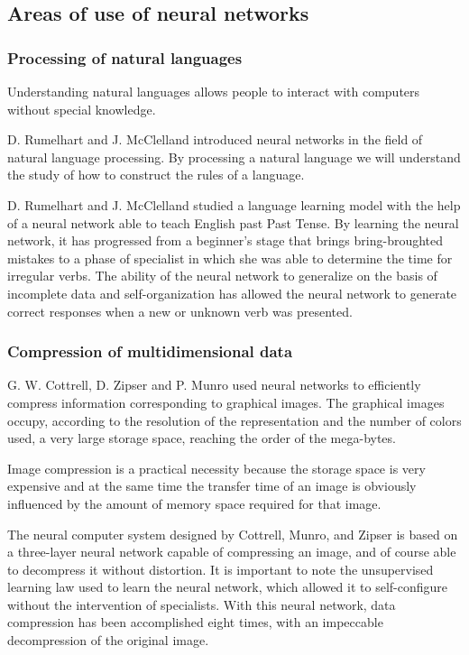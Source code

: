 \subsection{Areas of use of neural networks}

\subsubsection{Processing of natural languages}

Understanding natural languages allows people to interact with computers without special knowledge.

D. Rumelhart and J. McClelland \cite{Rumelhart} introduced neural networks in the field of natural language processing. By processing a natural language we will understand the study of how to construct the rules of a language.

D. Rumelhart and J. McClelland studied a language learning model with the help of a neural network able to teach English past Past Tense. By learning the neural network, it has progressed from a beginner's stage that brings bring-broughted mistakes to a phase of specialist in which she was able to determine the time for irregular verbs. The ability of the neural network to generalize on the basis of incomplete data and self-organization has allowed the neural network to generate correct responses when a new or unknown verb was presented.

\subsubsection{Compression of multidimensional data}

G. W. Cottrell, D. Zipser and P. Munro \cite{Cottrell} used neural networks to efficiently compress information corresponding to graphical images. The graphical images occupy, according to the resolution of the representation and the number of colors used, a very large storage space, reaching the order of the mega-bytes.

Image compression is a practical necessity because the storage space is very expensive and at the same time the transfer time of an image is obviously influenced by the amount of memory space required for that image.

The neural computer system designed by Cottrell, Munro, and Zipser is based on a three-layer neural network capable of compressing an image, and of course able to decompress it without distortion. It is important to note the unsupervised learning law used to learn the neural network, which allowed it to self-configure without the intervention of specialists. With this neural network, data compression has been accomplished eight times, with an impeccable decompression of the original image.


